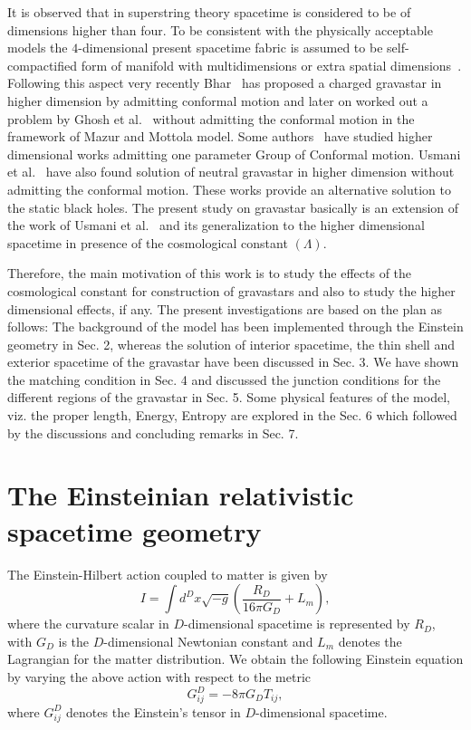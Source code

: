 \documentclass[preprint,12pt]{elsarticle}
\begin{document}
It is observed that in superstring theory spacetime is considered to be of dimensions higher than four. To be consistent with the
physically acceptable models the $4$-dimensional present spacetime fabric is assumed to be self-compactified form of manifold with
multidimensions or extra spatial dimensions~\cite{Schwarz1985,Weinberg1986,Duff1995,Polchinski1998,Hellerman2007,Aharony2007}.
Following this aspect very recently Bhar~\cite{Bhar2014} has proposed a charged gravastar in higher dimension by admitting conformal motion and later on worked out a problem by Ghosh et al.~\cite{Ghosh2017} without admitting the conformal motion in the framework of Mazur and Mottola model. Some authors~\cite{Pradhan2007,Emparan2008,Khadekar2014} have studied higher dimensional works admitting one parameter Group of Conformal motion. Usmani et al.~\cite{Usmani2011} have also found solution of neutral gravastar in higher dimension without admitting the conformal motion. These works provide an alternative solution to the static black holes. The present study on gravastar basically is an extension of the work of Usmani et al.~\cite{Usmani2011} and its generalization to the higher dimensional spacetime in presence of the cosmological constant $(\Lambda)$.

Therefore, the main motivation of this work is to study the effects of the cosmological constant for construction of gravastars and also to study the higher dimensional effects, if any. The present investigations are based on the plan as follows: The background of the model has been implemented through the Einstein geometry in Sec. 2, whereas the solution of interior spacetime, the thin shell and exterior spacetime of the gravastar have been discussed in Sec. 3. We have shown the matching condition in Sec. 4 and discussed the junction conditions for the different regions of the gravastar in Sec. 5. Some physical features of the model, viz. the proper length, Energy, Entropy are explored in the Sec. 6 which followed by the discussions and concluding remarks in Sec. 7.




\section{The Einsteinian relativistic spacetime geometry}
The Einstein-Hilbert action coupled to matter is given by
\begin{equation}
I = \int d^D x \sqrt{-g } \left( \frac{R_D}{16 \pi G_D} + L_{m}\right),\label{eq1}
\end{equation}
where the curvature scalar in $D$-dimensional spacetime is represented by $R_D$,
with $G_D$ is the $D$-dimensional Newtonian constant and $L_{m}$ denotes
the Lagrangian for the matter distribution. We obtain the following
Einstein equation by varying the above action with respect to the
metric
\begin{equation}
G^D_{ij}   = - 8 \pi G_D T_{ij},\label{eq2}
\end{equation}
where $G^D_{ij}$ denotes the Einstein's tensor in $D$-dimensional
spacetime.
\end{document}

